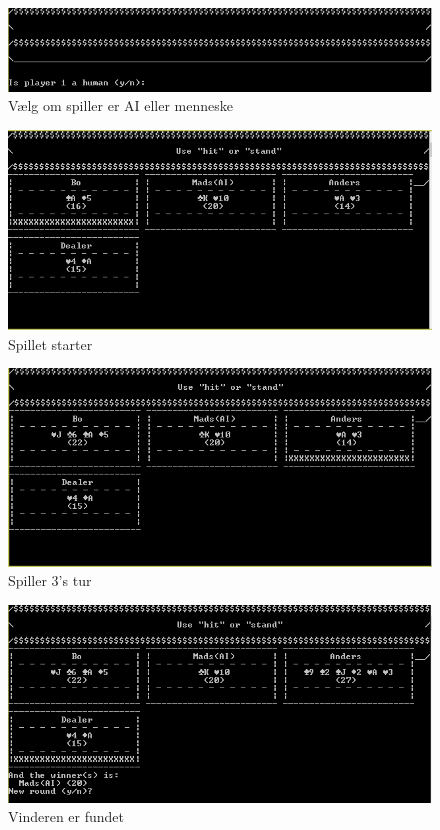 \documentclass[a4paper]{article}
\begin{document}
        \begin{figure}[H]
          \includegraphics{figures/PlayerIsHuman.PNG}

          \caption{Vælg om spiller er AI eller menneske}
          \label{fig:selectPlayerIsHuman}
        \end{figure}

        \begin{figure}[H]
          \includegraphics{figures/ScoreBoardDealed.PNG}

          \caption{Spillet starter}
          \label{fig:scoreboardDealed}
        \end{figure}

        \begin{figure}[H]
          \includegraphics{figures/Player3Playing.PNG}

          \caption{Spiller 3's tur}
          \label{fig:player3Turn}
        \end{figure}

        \begin{figure}[H]
          \includegraphics{figures/WinnerIs.PNG}

          \caption{Vinderen er fundet}
          \label{fig:winnerIsFound}
        \end{figure}
\end{document}
